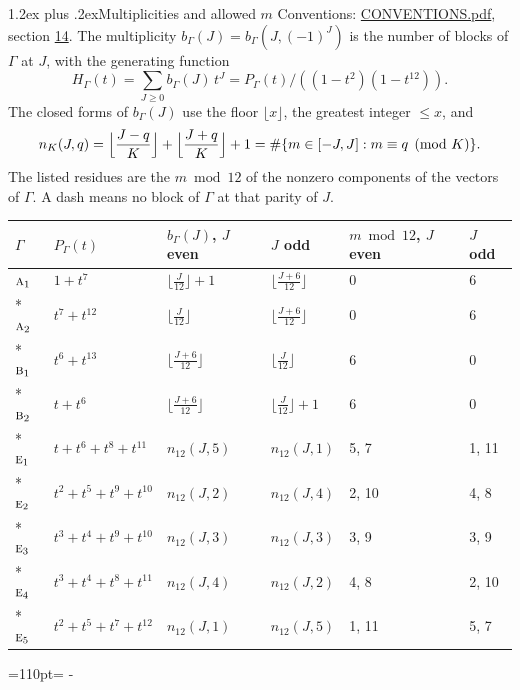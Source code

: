 \documentclass[10pt,a4paper]{article}
\makeatletter
\renewcommand\section{\@startsection{section}{1}{\z@}{-3ex plus -1ex minus -.2ex}%
  {1.2ex plus .2ex}{\normalfont\large\sffamily\bfseries\color{parttitle}}}
\newcommand{\needspace}[1]{\par\penalty-100\begingroup\dimen0=#1\relax\dimen2=\pagegoal
  \advance\dimen2-\pagetotal\ifdim\dimen0>\dimen2\relax\ifdim\dimen2>0pt\vfil\break\fi\fi
  \endgroup}
\numberwithin{equation}{section}
\newcommand{\irr}[1]{\text{\normalfont\scshape #1}}
\makeatother
\begin{document}
\section{Multiplicities and allowed \texorpdfstring{$m$}{m}}\label{s:multiplicities}
Conventions: \href{../../CONVENTIONS.pdf}{CONVENTIONS.pdf}, section \href{../../CONVENTIONS.pdf\#conv.14}{14}.
\leavevmode\label{n:function.generating}\label{n:index.generating.variable}\label{n:function.generating.numerator}The multiplicity $b_\Gamma(J) = b_\Gamma(J, (-1)^J)$ is the number of blocks of $\Gamma$ at $J$, with the generating function
\begin{equation}\label{e:gf}H_\Gamma(t) = \sum_{J\ge0} b_\Gamma(J)\,t^J = P_\Gamma(t)/((1-t^{2})(1-t^{12})).\end{equation}
\leavevmode\label{n:delimiter.floor}\label{n:local.floor.x}\label{n:function.count}\label{n:index.modulus.K}\label{n:index.residue}The closed forms of $b_\Gamma(J)$ use the floor $\lfloor x\rfloor$, the greatest integer $\le x$, and
\begin{equation}\label{e:count}n_K(J,q) = \Bigl\lfloor\frac{J-q}{K}\Bigr\rfloor + \Bigl\lfloor\frac{J+q}{K}\Bigr\rfloor + 1 = \#\{m\in[-J,J] : m\equiv q \pmod{K}\}.\end{equation}
\leavevmode\label{n:head.parity}The listed residues are the $m \bmod 12$ of the nonzero components of the vectors of $\Gamma$. A dash means no block of $\Gamma$ at that parity of $J$.
{\small{\renewcommand{\arraystretch}{1.3}\begin{longtable}{@{}llllll@{}}\toprule
$\Gamma$ & $P_\Gamma(t)$ & $b_\Gamma(J)$, $J$ even & $J$ odd & $m \bmod 12$, $J$ even & $J$ odd\\\midrule\endhead
\bottomrule\endfoot\endlastfoot
$\irr{a}_{1}$ & $1 + t^{7}$ & $\bigl\lfloor\tfrac{J}{12}\bigr\rfloor + 1$ & $\bigl\lfloor\tfrac{J+6}{12}\bigr\rfloor$ & 0 & 6\\*
$\irr{a}_{2}$ & $t^{7} + t^{12}$ & $\bigl\lfloor\tfrac{J}{12}\bigr\rfloor$ & $\bigl\lfloor\tfrac{J+6}{12}\bigr\rfloor$ & 0 & 6\\*
$\irr{b}_{1}$ & $t^{6} + t^{13}$ & $\bigl\lfloor\tfrac{J+6}{12}\bigr\rfloor$ & $\bigl\lfloor\tfrac{J}{12}\bigr\rfloor$ & 6 & 0\\*
$\irr{b}_{2}$ & $t + t^{6}$ & $\bigl\lfloor\tfrac{J+6}{12}\bigr\rfloor$ & $\bigl\lfloor\tfrac{J}{12}\bigr\rfloor + 1$ & 6 & 0\\*
$\irr{e}_{1}$ & $t + t^{6} + t^{8} + t^{11}$ & $n_{12}(J,5)$ & $n_{12}(J,1)$ & 5, 7 & 1, 11\\*
$\irr{e}_{2}$ & $t^{2} + t^{5} + t^{9} + t^{10}$ & $n_{12}(J,2)$ & $n_{12}(J,4)$ & 2, 10 & 4, 8\\*
$\irr{e}_{3}$ & $t^{3} + t^{4} + t^{9} + t^{10}$ & $n_{12}(J,3)$ & $n_{12}(J,3)$ & 3, 9 & 3, 9\\*
$\irr{e}_{4}$ & $t^{3} + t^{4} + t^{8} + t^{11}$ & $n_{12}(J,4)$ & $n_{12}(J,2)$ & 4, 8 & 2, 10\\*
$\irr{e}_{5}$ & $t^{2} + t^{5} + t^{7} + t^{12}$ & $n_{12}(J,1)$ & $n_{12}(J,5)$ & 1, 11 & 5, 7\\
\bottomrule\end{longtable}}}
\needspace{110pt}
\end{document}
